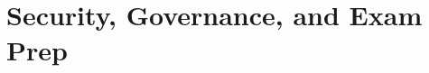 \documentclass[11pt,a4paper,oneside]{book}
\begin{document}
\part{Security, Governance, and Exam Prep}





\appendix









\backmatter



\printindex
\end{document}
